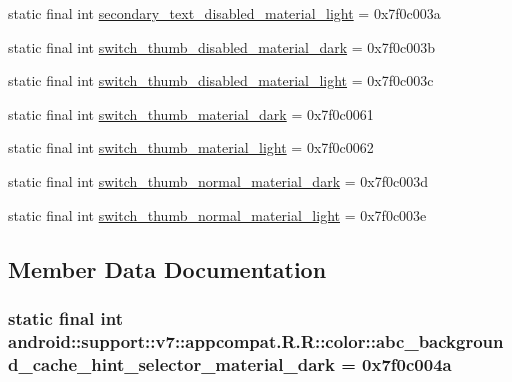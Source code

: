 \begin{CompactItemize}
\item 
static final int \hyperlink{classandroid_1_1support_1_1v7_1_1appcompat_1_1_r_1_1color_4c12bd22132a59d46c389a03d32e6a2f}{secondary\_\-text\_\-disabled\_\-material\_\-light} = 0x7f0c003a
\item 
static final int \hyperlink{classandroid_1_1support_1_1v7_1_1appcompat_1_1_r_1_1color_b5ba819ce4c2e83b2a274f3f68649518}{switch\_\-thumb\_\-disabled\_\-material\_\-dark} = 0x7f0c003b
\item 
static final int \hyperlink{classandroid_1_1support_1_1v7_1_1appcompat_1_1_r_1_1color_cffd597afd6d6d95c3fbaa5b6abb6d26}{switch\_\-thumb\_\-disabled\_\-material\_\-light} = 0x7f0c003c
\item 
static final int \hyperlink{classandroid_1_1support_1_1v7_1_1appcompat_1_1_r_1_1color_b200dd1b68a0181c41da51c35d70c4b3}{switch\_\-thumb\_\-material\_\-dark} = 0x7f0c0061
\item 
static final int \hyperlink{classandroid_1_1support_1_1v7_1_1appcompat_1_1_r_1_1color_431cc7f1015b6969bac0595ba37bc323}{switch\_\-thumb\_\-material\_\-light} = 0x7f0c0062
\item 
static final int \hyperlink{classandroid_1_1support_1_1v7_1_1appcompat_1_1_r_1_1color_40bd402cb9af4c48ef074c316d6ef4c1}{switch\_\-thumb\_\-normal\_\-material\_\-dark} = 0x7f0c003d
\item 
static final int \hyperlink{classandroid_1_1support_1_1v7_1_1appcompat_1_1_r_1_1color_e1fef27b12486615d6e900b3c0e614f7}{switch\_\-thumb\_\-normal\_\-material\_\-light} = 0x7f0c003e
\end{CompactItemize}


\subsection{Member Data Documentation}
\hypertarget{classandroid_1_1support_1_1v7_1_1appcompat_1_1_r_1_1color_f303afd51d0acb06eb9d3f82af1f73e4}{
\subsubsection[{abc\_\-background\_\-cache\_\-hint\_\-selector\_\-material\_\-dark}]{\setlength{\rightskip}{0pt plus 5cm}static final int android::support::v7::appcompat.R.R::color::abc\_\-background\_\-cache\_\-hint\_\-selector\_\-material\_\-dark = 0x7f0c004a}}
\label{classandroid_1_1support_1_1v7_1_1appcompat_1_1_r_1_1color_f303afd51d0acb06eb9d3f82af1f73e4}


